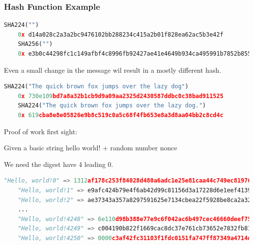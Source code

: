 \begin{frame}[fragile]
    \frametitle{Hash Function Example}
    \begin{lstlisting}[language=Python]
    SHA224("")
    0x d14a028c2a3a2bc9476102bb288234c415a2b01f828ea62ac5b3e42f
    SHA256("")
    0x e3b0c44298fc1c149afbf4c8996fb92427ae41e4649b934ca495991b7852b855
    \end{lstlisting}

    Even a small change in the message wil result in a mostly different hash.
    \begin{lstlisting}[language=Python]
    SHA224("The quick brown fox jumps over the lazy dog")
    0x 730e109bd7a8a32b1cb9d9a09aa2325d2430587ddbc0c38bad911525
    SHA224("The quick brown fox jumps over the lazy dog.")
    0x 619cba8e8e05826e9b8c519c0a5c68f4fb653e8a3d8aa04bb2c8cd4c
    \end{lstlisting}

    Proof of work first sight:

    Given a basic string \alert{hello world!} + random number \alert{nonce}

    We need the digest have 4 leading 0.
    \begin{lstlisting}[language=Python]
    "Hello, world!0" => 1312af178c253f84028d480a6adc1e25e81caa44c749ec81976192e2ec934c64
    "Hello, world!1" => e9afc424b79e4f6ab42d99c81156d3a17228d6e1eef4139be78e948a9332a7d8
    "Hello, world!2" => ae37343a357a8297591625e7134cbea22f5928be8ca2a32aa475cf05fd4266b7
    ...
    "Hello, world!4248" => 6e110d98b388e77e9c6f042ac6b497cec46660deef75a55ebc7cfdf65cc0b965
    "Hello, world!4249" => c004190b822f1669cac8dc37e761cb73652e7832fb814565702245cf26ebb9e6
    "Hello, world!4250" => 0000c3af42fc31103f1fdc0151fa747ff87349a4714df7cc52ea464e12dcd4e9
    \end{lstlisting}
\end{frame}

